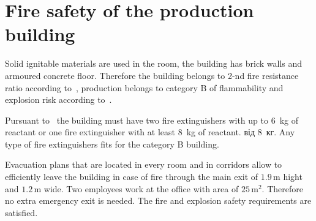 \section{Fire safety of the production building}
Solid ignitable materials are used in the room, the building has brick walls
and armoured concrete floor. Therefore the building belongs to 2-nd fire
resistance ratio according to~\cite{dbn_b11}, production belongs to category B
of flammability and explosion risk according to~\cite{napb002}.

Pursuant to~\cite{napb001} the building must have two fire extinguishers with
up to 6~kg of reactant or one fire extinguisher with at least 8~kg of reactant.
від 8~кг. Any type of fire extinguishers fits for the category B building.

Evacuation plans that are located in every room and in corridors allow to
efficiently leave the building in case of fire through the main exit of 
 $1.9 \, \text{m}$ hight and $1.2 \, \text{m}$ wide. Two employees work at the
 office with area of $25 \, \text{m}^2$. Therefore no extra emergency exit is
 needed. The fire and explosion safety requirements are satisfied.
